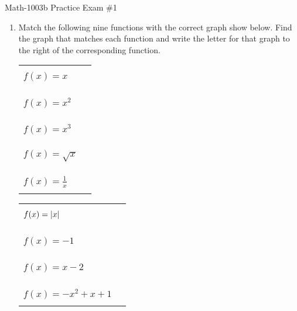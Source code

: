 \documentclass[letterpaper,12pt,fleqn]{article}
\begin{document}
\begin{center}
\Large Math-1003b Practice Exam \#1
\end{center}

\begin{enumerate}
  \newcommand{\ans}{\rule{0.5in}{1pt}}

\item Match the following nine functions with the correct graph show below. Find
  the graph that matches each function and write the letter for that graph
  to the right of the corresponding function.

  \vspace{0.25in}

  \begin{minipage}[t]{3in}
    \begin{tabular}{lc}
      $f(x)=x$ & \ans \\
      \\
      $f(x)=x^2$ & \ans \\
      \\
      $f(x)=x^3$ & \ans \\
      \\
      $f(x)=\sqrt{x}$ & \ans \\
      \\
      $f(x)=\frac{1}{x}$ & \ans \\
    \end{tabular}
  \end{minipage}
  \begin{minipage}[t]{3in}
    \begin{tabular}{lc}
      $f(x)=\lvert x\rvert$ & \ans \\
      \\
      $f(x)=-1$ & \ans \\
      \\
      $f(x)=x-2$ & \ans \\
      \\
      $f(x)=-x^2+x+1$ & \ans \\
    \end{tabular}
  \end{minipage}

  \vspace{0.25in}


\end{enumerate}
\end{document}

